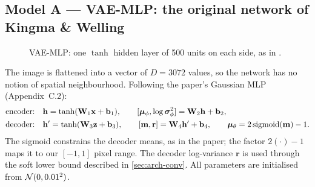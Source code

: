\subsection{Model A --- VAE-MLP: the original network of Kingma \& Welling}
\label{sec:arch-mlp}

\begin{figure}[H]
\centering
{}
\caption{VAE-MLP: one $\tanh$ hidden layer of 500 units on each side, as in \citet{kingma2014vae}.}
\label{fig:arch-mlp}
\end{figure}

The image is flattened into a vector of $D=3072$ values, so the network has no notion of spatial neighbourhood.
Following the paper's Gaussian MLP (Appendix~C.2):
\begin{align}
  \text{encoder:}\quad & \mathbf{h} = \tanh(\mathbf{W}_1\mathbf{x} + \mathbf{b}_1),\qquad
                         [\bm{\mu}_\phi,\log\bm{\sigma}^2_\phi] = \mathbf{W}_2\mathbf{h} + \mathbf{b}_2,\\
  \text{decoder:}\quad & \mathbf{h}' = \tanh(\mathbf{W}_3\mathbf{z} + \mathbf{b}_3),\qquad
                         [\mathbf{m},\mathbf{r}] = \mathbf{W}_4\mathbf{h}'+\mathbf{b}_4,\qquad
                         \bm{\mu}_\theta = 2\,\mathrm{sigmoid}(\mathbf{m})-1.
\end{align}
The sigmoid constrains the decoder means, as in the paper; the factor $2(\cdot)-1$ maps it to our $[-1,1]$ pixel
range. The decoder log-variance $\mathbf{r}$ is used through the soft lower bound described in
\cref{sec:arch-conv}. All parameters are initialised from $\mathcal{N}(0,0.01^2)$.

